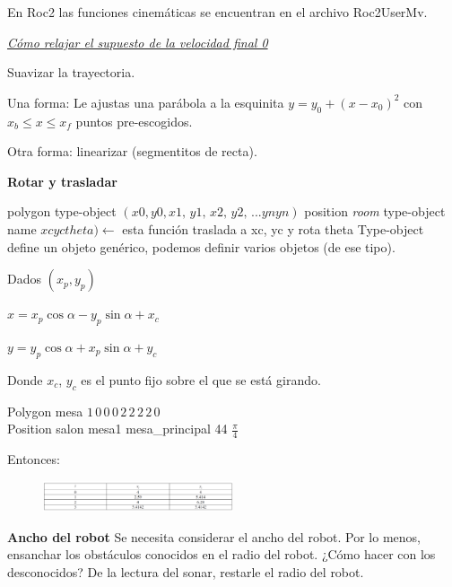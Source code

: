 En Roc2 las funciones cinemáticas se encuentran en el archivo Roc2UserMv.

\underline{\textit{Cómo relajar el supuesto de la velocidad final 0}}

Suavizar la trayectoria.

\begin{scaja} 
	
	Una forma: Le ajustas una parábola a la esquinita
	$y=y_0 + (x-x_0)^2$ con $x_b \leq x \leq x_f $ puntos pre-escogidos.
	
	\vspace{5mm}
	
	Otra forma: linearizar (segmentitos de recta).
	
\end{scaja}

\textbf{Rotar y trasladar}

polygon type-object $(x0,  y0, x1, \, y1, \, x2, \, y2, \, ... yn yn)$
position \textit{room} type-object name $xc yc theta ) \leftarrow$ esta función traslada a xc, yc y rota theta
Type-object define un objeto genérico, podemos definir varios objetos (de ese tipo).

\vspace{5mm}
Dados $(x_p,y_p)$


$ x= x_p \cos\alpha - y_p \sin\alpha +x_c $

$y = y_p \cos\alpha + x_p \sin\alpha +y_c$

Donde $x_c$, $y_c$ es el punto fijo sobre el que se está girando.

\begin{ejemplo}
	Polygon mesa $1 \, 0 \, 0\, 0\, 2\, 2\, 2\, 2\, 0$ \\	
	Position salon mesa1 mesa\_principal 44 $\frac{\pi}{4}$
\end{ejemplo}

Entonces:

\begin{figure}[h!]
	\centering
	\includegraphics[width=0.5\textwidth]{images/img69.png}
	\label{figura69}
\end{figure}

\textbf{Ancho del robot}
Se necesita considerar el ancho del robot. Por lo menos, ensanchar los obstáculos conocidos en el radio del
robot.
¿Cómo hacer con los desconocidos? De la lectura del sonar, restarle el radio del robot.

